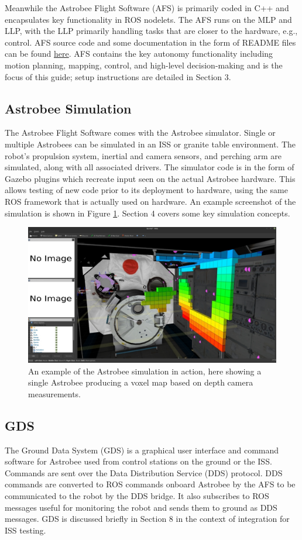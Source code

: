 \documentclass{article}
\begin{document}
Meanwhile the Astrobee Flight Software (AFS) is primarily coded in C++ and encapsulates key functionality in ROS nodelets. The AFS runs on the MLP and LLP, with the LLP primarily handling tasks that are closer to the hardware, e.g., control. AFS source code and some documentation in the form of README files can be found \href{https://github.com/nasa/astrobee}{here}. AFS contains the key autonomy functionality including motion planning, mapping, control, and high-level decision-making and is the focus of this guide; setup instructions are detailed in Section 3.

\subsection{Astrobee Simulation}
The Astrobee Flight Software comes with the Astrobee simulator. Single or multiple Astrobees can be simulated in an ISS or granite table environment. The robot's propulsion system, inertial and camera sensors, and  perching arm are simulated, along with all associated drivers. The simulator code is in the form of Gazebo plugins which recreate input seen on the actual Astrobee hardware. This allows testing of new code prior to its deployment to hardware, using the same ROS framework that is actually used on hardware. An example screenshot of the simulation is shown in Figure \ref{fig:sim}. Section 4 covers some key simulation concepts.

\begin{figure}
    \centering
    \includegraphics[width=\textwidth]{img/sim.jpg}
    \caption{An example of the Astrobee simulation in action, here showing a single Astrobee producing a voxel map based on depth camera measurements.}
    \label{fig:sim}
\end{figure}

\subsection{GDS}
The Ground Data System (GDS) is a graphical user interface and command software for Astrobee used from control stations on the ground or the ISS. Commands are sent over the  Data Distribution Service (DDS) protocol. DDS commands are converted to ROS commands onboard Astrobee by the AFS to be communicated to the robot by the DDS bridge. It also subscribes to ROS messages useful for monitoring the robot and sends them to ground as DDS messages. GDS is discussed briefly in Section 8 in the context of integration for ISS testing.
\end{document}
